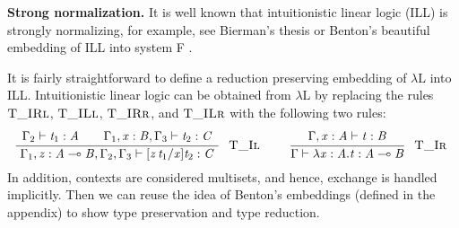 \documentclass{llncs}
\begin{document}
\textbf{Strong normalization.}  It is well known that intuitionistic
linear logic (ILL) is strongly normalizing, for example, see Bierman's
thesis \cite{Bierman:1994} or Benton's beautiful embedding of ILL into
system F \cite{Benton:1995c}.  

It is fairly straightforward to define
a reduction preserving embedding of $\lambda\text{L}$ 
into ILL.  Intuitionistic
linear logic can be obtained from $\lambda\text{L}$ by replacing the
rules $\Ldrulename{T\_IRl}$, $\Ldrulename{T\_ILl}$,
$\Ldrulename{T\_IRr}$, and $\Ldrulename{T\_ILr}$ with the following
two rules:
\[
\begin{array}{cccccccc}
  \LdruleTXXIl{} & \quad \LdruleTXXIr{}
\end{array}
\]
In addition, contexts are considered multisets, and hence, exchange is
handled implicitly. Then we can reuse the idea of Benton's embeddings (defined in the appendix) to show type preservation and type reduction.
\end{document}
